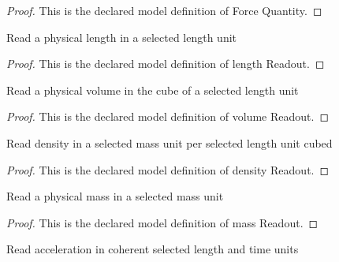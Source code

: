 \begin{proof}
  This is the declared model definition of Force Quantity.
\end{proof}
\begin{definition}
  \label{def:physics:phyx-mini-0722:phyxminiproblems-problemphyxmini0722-lengthreadout}
  Read a physical length in a selected length unit
\end{definition}
\begin{proof}
  This is the declared model definition of length Readout.
\end{proof}
\begin{definition}
  \label{def:physics:phyx-mini-0722:phyxminiproblems-problemphyxmini0722-volumereadout}
  Read a physical volume in the cube of a selected length unit
\end{definition}
\begin{proof}
  This is the declared model definition of volume Readout.
\end{proof}
\begin{definition}
  \label{def:physics:phyx-mini-0722:phyxminiproblems-problemphyxmini0722-densityreadout}
  Read density in a selected mass unit per selected length unit cubed
\end{definition}
\begin{proof}
  This is the declared model definition of density Readout.
\end{proof}
\begin{definition}
  \label{def:physics:phyx-mini-0722:phyxminiproblems-problemphyxmini0722-massreadout}
  Read a physical mass in a selected mass unit
\end{definition}
\begin{proof}
  This is the declared model definition of mass Readout.
\end{proof}
\begin{definition}
  \label{def:physics:phyx-mini-0722:phyxminiproblems-problemphyxmini0722-accelerationreadout}
  Read acceleration in coherent selected length and time units
\end{definition}

